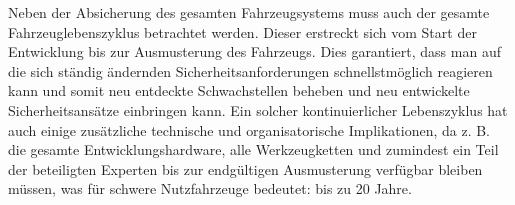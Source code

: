 Neben der Absicherung des gesamten Fahrzeugsystems muss auch der 
gesamte Fahrzeuglebenszyklus betrachtet werden. Dieser erstreckt sich 
vom Start der Entwicklung bis zur Ausmusterung des Fahrzeugs. Dies garantiert, 
dass man auf die sich ständig ändernden Sicherheitsanforderungen schnellstmöglich 
reagieren kann und somit neu entdeckte Schwachstellen beheben und neu entwickelte 
Sicherheitsansätze einbringen kann.
\newline
Ein solcher kontinuierlicher Lebenszyklus hat auch einige zusätzliche technische 
und organisatorische Implikationen, da z. B. die gesamte Entwicklungshardware, alle 
Werkzeugketten und zumindest ein Teil der beteiligten Experten bis zur endgültigen 
Ausmusterung verfügbar bleiben müssen, was für schwere Nutzfahrzeuge bedeutet: bis zu 20 Jahre.
